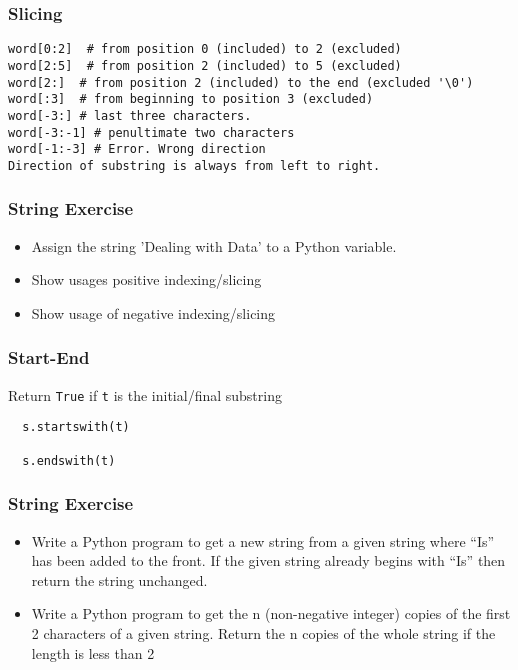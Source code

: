 \begin{frame}[fragile]\frametitle{Slicing}
\begin{lstlisting}
word[0:2]  # from position 0 (included) to 2 (excluded)
word[2:5]  # from position 2 (included) to 5 (excluded)
word[2:]  # from position 2 (included) to the end (excluded '\0')
word[:3]  # from beginning to position 3 (excluded)
word[-3:] # last three characters. 
word[-3:-1] # penultimate two characters
word[-1:-3] # Error. Wrong direction
Direction of substring is always from left to right.
\end{lstlisting}
\end{frame}

\begin{frame}[fragile]\frametitle{String Exercise}
  \begin{itemize}
  \item Assign the string 'Dealing with Data' to a Python variable.
  \item  Show usages positive indexing/slicing
  \item  Show usage of negative indexing/slicing
  \end{itemize}
\end{frame}



\begin{frame}[fragile]\frametitle{Start-End}
    Return \texttt{True} if \texttt{t} is the initial/final substring
  \begin{lstlisting}
  s.startswith(t)

  s.endswith(t)
  \end{lstlisting}
\end{frame}

\begin{frame}[fragile]\frametitle{String Exercise}
  \begin{itemize}
  \item Write a Python program to get a new string from a given string where ``Is'' has been added to the front. If the given string already begins with ``Is'' then return the string unchanged.
  \item  Write a Python program to get the n (non-negative integer) copies of the first 2 characters of a given string. Return the n copies of the whole string if the length is less than 2
  \end{itemize}
\end{frame}

